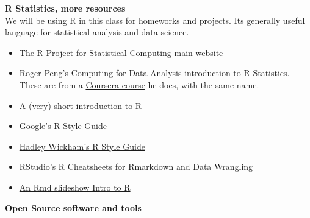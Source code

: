 \documentclass[11pt]{article} %
\begin{document}
    {\bf R Statistics, more resources} \\
              We will be using R in this class for homeworks and projects. Its generally useful language for statistical analysis and data science. 
      \begin{itemize}
        \item \href{"http://www.r-project.org/index.html"}{The R Project for Statistical Computing}  \cite{r_r_2014} main website
        \item \href{"https://www.youtube.com/user/rdpeng/playlists"}{Roger Peng's Computing for Data Analysis introduction to R Statistics}. 
        These are from a \href{"https://www.coursera.org/course/compdata"} {Coursera course} he does, with the same name. \cite{peng_computing_2014}\item \href{"http://cran.r-project.org/doc/contrib/Torfs+Brauer-Short-R-Intro.pdf"}{A (very) short introduction to R}  \cite{torfs_very_2014}
        \item \href{"https://google-styleguide.googlecode.com/svn/trunk/Rguide.xml"}{ Google's R Style Guide}
        \item \href{"http://stat405.had.co.nz/r-style.html"}{ Hadley Wickham's R Style Guide}  
        \item \href{"http://www.rstudio.com/resources/cheatsheets/"}{ RStudio's R Cheatsheets for Rmarkdown and Data Wrangling}
        \item \href{"http://www.theresearchkitchen.com/blog"}{An Rmd slideshow Intro to R}
      \end{itemize}
    
    {\bf Open Source software and tools} \\
    
\end{document}
